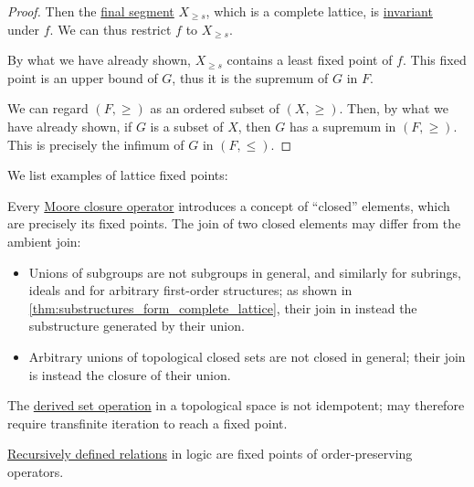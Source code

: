 \begin{proof}
  Then the \hyperref[def:order_interval/unbounded]{final segment} \( X_{\geq s} \), which is a complete lattice, is \hyperref[def:invariant_subset]{invariant} under \( f \). We can thus restrict \( f \) to \( X_{\geq s} \).

  By what we have already shown, \( X_{\geq s} \) contains a least fixed point of \( f \). This fixed point is an upper bound of \( G \), thus it is the supremum of \( G \) in \( F \).

   We can regard \( (F, \geq) \) as an ordered subset of \( (X, \geq) \). Then, by what we have already shown, if \( G \) is a subset of \( X \), then \( G \) has a supremum in \( (F, \geq) \). This is precisely the infimum of \( G \) in \( (F, \leq) \).
\end{proof}

\begin{example}\label{ex:thm:knaster_tarski}
  We list examples of lattice fixed points:
  \begin{thmenum}
     Every \hyperref[def:moore_closure_operator]{Moore closure operator} introduces a concept of \enquote{closed} elements, which are precisely its fixed points. The join of two closed elements may differ from the ambient join:
    \begin{itemize}
      \item Unions of subgroups are not subgroups in general, and similarly for subrings, ideals and for arbitrary first-order structures; as shown in \cref{thm:substructures_form_complete_lattice}, their join in instead the substructure generated by their union.
      \item Arbitrary unions of topological closed sets are not closed in general; their join is instead the closure of their union.
    \end{itemize}

     The \hyperref[def:derived_set]{derived set operation} in a topological space is not idempotent;  may therefore require transfinite iteration to reach a fixed point.

     \hyperref[thm:recursively_defined_relations]{Recursively defined relations} in logic are fixed points of order-preserving operators.
  \end{thmenum}
\end{example}

